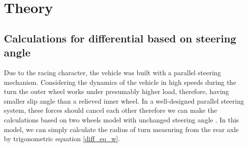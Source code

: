 




\chapter{Theory}

\section{Calculations for differential based on steering angle} \label{diff_calc}

Due to the racing character, the vehicle was built with a parallel steering mechanism. Considering the dynamics of the vehicle in high speeds during the turn the outer wheel works under presumably higher load, therefore, having smaller slip angle than a relieved inner wheel. In a well-designed parallel steering system, these forces should cancel each other therefore we can make the calculations based on two wheels model with unchanged steering angle .
In this model, we can simply calculate the radius of turn measuring from the rear axle by trigonometric equation \ref{diff_eq_w}.

